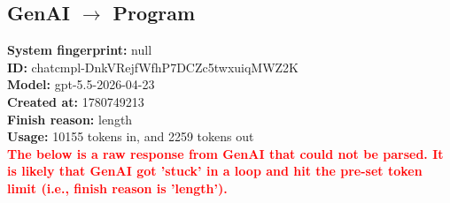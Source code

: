 \documentclass{article}
\begin{document}
\subsection*{GenAI $\rightarrow$ Program}
\textbf{System fingerprint: }null
\\\textbf{ID: }chatcmpl-DnkVRejfWfhP7DCZc5twxuiqMWZ2K
\\\textbf{Model: }gpt-5.5-2026-04-23
\\\textbf{Created at: }1780749213
\\\textbf{Finish reason: }length
\\\textbf{Usage: }10155 tokens in, and 2259 tokens out
\\\textcolor{red}{\textbf{The below is a raw response from GenAI that could not be parsed. It is likely that GenAI got 'stuck' in a loop and hit the pre-set token limit (i.e., finish reason is 'length').}}
\begin{lstlisting}

\end{lstlisting}
\end{document}
